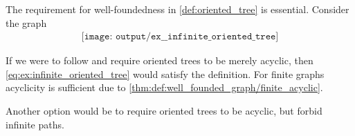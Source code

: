 \begin{example}\label{ex:infinite_oriented_tree}
  The requirement for well-foundedness in \cref{def:oriented_tree} is essential. Consider the graph
  \begin{equation}\label{eq:ex:infinite_oriented_tree}
    \begin{aligned}
      \texttt{[image: output/ex\_\_infinite\_oriented\_tree]}
    \end{aligned}
  \end{equation}

  If we were to follow  and require oriented trees to be merely acyclic, then \eqref{eq:ex:infinite_oriented_tree} would satisfy the definition. For finite graphs acyclicity is sufficient due to \cref{thm:def:well_founded_graph/finite_acyclic}.

  Another option would be to require oriented trees to be acyclic, but forbid infinite paths.
\end{example}

